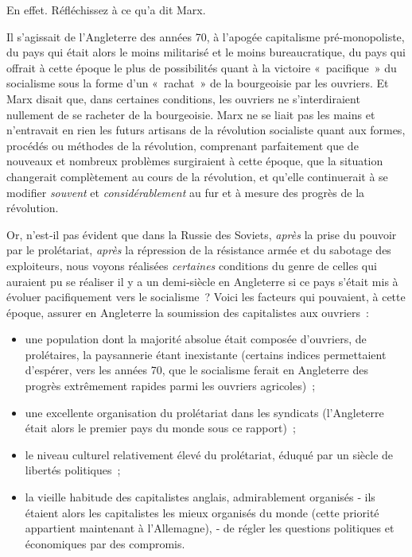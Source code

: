 \documentclass[french,twoside]{book} %
\begin{document}
En effet. Réfléchissez à ce qu’a dit Marx.\par
\bigbreak
\noindent Il s’agissait de l’Angleterre des années 70, à l’apogée capitalisme pré-monopoliste, du pays qui était alors le moins militarisé et le moins bureaucratique, du pays qui offrait à cette époque le plus de possibilités quant à la victoire « pacifique » du socialisme sous la forme d’un « rachat » de la bourgeoisie par les ouvriers. Et Marx disait que, dans certaines conditions, les ouvriers ne s’interdiraient nullement de se racheter de la bourgeoisie. Marx ne se liait pas les mains et n’entravait en rien les futurs artisans de la révolution socialiste quant aux formes, procédés ou méthodes de la révolution, comprenant parfaitement que de nouveaux et nombreux problèmes surgiraient à cette époque, que la situation changerait complètement au cours de la révolution, et qu’elle continuerait à se modifier \emph{souvent} et \emph{considérablement} au fur et à mesure des progrès de la révolution.\par
Or, n’est‑il pas évident que dans la Russie des Soviets, \emph{après} la prise du pouvoir par le prolétariat, \emph{après} la répression de la résistance armée et du sabotage des exploiteurs, nous voyons réalisées \emph{certaines} conditions du genre de celles qui auraient pu se réaliser il y a un demi‑siècle en Angleterre si ce pays s’était mis à évoluer pacifiquement vers le socialisme ? Voici les facteurs qui pouvaient, à cette époque, assurer en Angleterre la soumission des capitalistes aux ouvriers :\par

\begin{itemize}[itemsep=0pt,]
\item une population dont la majorité absolue était composée d’ouvriers, de prolétaires, la paysannerie étant inexistante (certains indices permettaient d’espérer, vers les années 70, que le socialisme ferait en Angleterre des progrès extrêmement rapides parmi les ouvriers agricoles) ;
\item une excellente organisation du prolétariat dans les syndicats (l’Angleterre était alors le premier pays du monde sous ce rapport) ;
\item le niveau culturel relativement élevé du prolétariat, éduqué par un siècle de libertés politiques ;
\item la vieille habitude des capitalistes anglais, admirablement organisés ‑ ils étaient alors les capitalistes les mieux organisés du monde (cette priorité appartient maintenant à l’Allemagne), ‑ de régler les questions politiques et économiques par des compromis.
\end{itemize}
\end{document}
